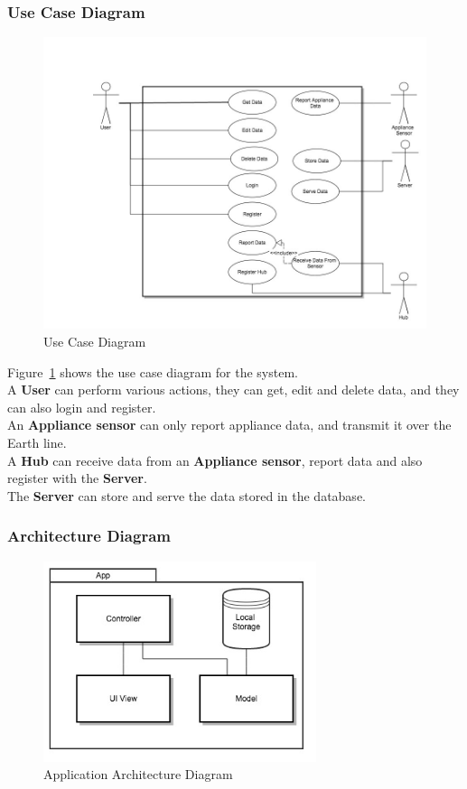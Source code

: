 \documentclass[draft,preprint,12pt,3p]{elsarticle}
\begin{document}
\subsubsection{Use Case Diagram}
\begin{figure}[H]
    \includegraphics[width=\columnwidth]{diagrams/UseCase}
    \caption {Use Case Diagram}
    \label{fig:usecaseoverall}
\end{figure}
Figure~\ref{fig:usecaseoverall} shows the use case diagram for the system.\\
A \textbf{User} can perform various actions, they can get, edit and delete data, and they can also login and register.\\
An \textbf{Appliance sensor} can only report appliance data, and transmit it over the Earth line.\\
A \textbf{Hub} can receive data from an \textbf{Appliance sensor}, report data and also register with the \textbf{Server}.\\
The \textbf{Server} can store and serve the data stored in the database.

\subsubsection{Architecture Diagram}
\begin{figure}[H]
    \centering
    \includegraphics[width=8cm]{diagrams/app}
    \caption {Application Architecture Diagram}
\end{figure}
\end{document}
